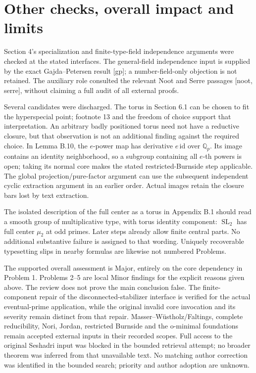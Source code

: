 \documentclass[10pt]{article}
\begin{document}
\section*{Other checks, overall impact and limits}
Section 4’s specialization and finite-type-field independence arguments were checked at the stated interfaces. The general-field independence input is supplied by the exact Gajda–Petersen result [gp]; a number-field-only objection is not retained. The auxiliary role consulted the relevant Noot and Serre passages [noot, serre], without claiming a full audit of all external proofs.\par
Several candidates were discharged. The torus in Section 6.1 can be chosen to fit the hyperspecial point; footnote 13 and the freedom of choice support that interpretation. An arbitrary badly positioned torus need not have a reductive closure, but that observation is not an additional finding against the required choice. In Lemma B.10, the \(e\)-power map has derivative \(e\,\mathrm{id}\) over \(\mathbb Q_p\). Its image contains an identity neighborhood, so a subgroup containing all \(e\)-th powers is open; taking its normal core makes the stated restricted-Burnside step applicable. The global projection/pure-factor argument can use the subsequent independent cyclic extraction argument in an earlier order. Actual images retain the closure bars lost by text extraction.\par
The isolated description of the full center as a torus in Appendix B.1 should read a smooth group of multiplicative type, with torus identity component: \(\operatorname{SL}_2\) has full center \(\mu_2\) at odd primes. Later steps already allow finite central parts. No additional substantive failure is assigned to that wording. Uniquely recoverable typesetting slips in nearby formulas are likewise not numbered Problems.\par
The supported overall assessment is Major, entirely on the core dependency in Problem 1. Problems 2–5 are local Minor findings for the explicit reasons given above. The review does not prove the main conclusion false. The finite-component repair of the disconnected-stabilizer interface is verified for the actual eventual-prime application, while the original invalid core invocation and its severity remain distinct from that repair. Masser–Wüstholz/Faltings, complete reducibility, Nori, Jordan, restricted Burnside and the o-minimal foundations remain accepted external inputs in their recorded scopes. Full access to the original Seshadri input was blocked in the bounded retrieval attempt; no broader theorem was inferred from that unavailable text. No matching author correction was identified in the bounded search; priority and author adoption are unknown.\par
\end{document}
